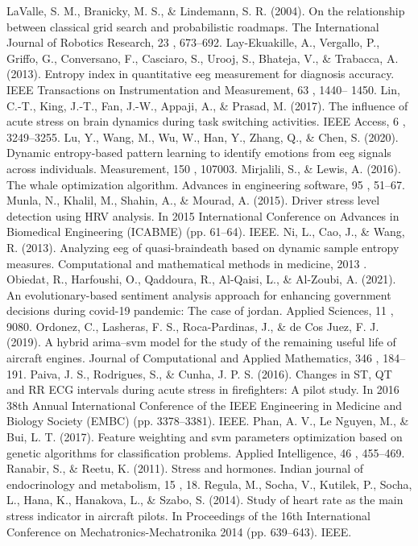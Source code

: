 LaValle, S. M., Branicky, M. S., \& Lindemann, S. R. (2004). On the relationship between classical grid search and probabilistic roadmaps. The International Journal of Robotics Research, 23 , 673–692.
Lay-Ekuakille, A., Vergallo, P., Griffo, G., Conversano, F., Casciaro, S., Urooj, S., Bhateja, V., \& Trabacca, A. (2013). Entropy index in quantitative eeg measurement for diagnosis accuracy. IEEE Transactions on Instrumentation and Measurement, 63 , 1440– 1450.
Lin, C.-T., King, J.-T., Fan, J.-W., Appaji, A., \& Prasad, M. (2017). The influence of acute stress on brain dynamics during task switching activities. IEEE Access, 6 , 3249–3255.
Lu, Y., Wang, M., Wu, W., Han, Y., Zhang, Q., \& Chen, S. (2020). Dynamic entropy-based pattern learning to identify emotions from eeg signals across individuals. Measurement, 150 , 107003.
Mirjalili, S., \& Lewis, A. (2016). The whale optimization algorithm. Advances in engineering software, 95 , 51–67.
Munla, N., Khalil, M., Shahin, A., \& Mourad, A. (2015). Driver stress level detection using HRV analysis. In 2015 International Conference on Advances in Biomedical Engineering (ICABME) (pp. 61–64). IEEE.
Ni, L., Cao, J., \& Wang, R. (2013). Analyzing eeg of quasi-braindeath based on dynamic sample entropy measures. Computational and mathematical methods in medicine, 2013 .
Obiedat, R., Harfoushi, O., Qaddoura, R., Al-Qaisi, L., \& Al-Zoubi, A. (2021). An evolutionary-based sentiment analysis approach for enhancing government decisions during covid-19 pandemic: The case of jordan. Applied Sciences, 11 , 9080.
Ordonez, C., Lasheras, F. S., Roca-Pardinas, J., \& de Cos Juez, F. J. (2019). A hybrid arima–svm model for the study of the remaining useful life of aircraft engines. Journal of Computational and Applied Mathematics, 346 , 184–191.
Paiva, J. S., Rodrigues, S., \& Cunha, J. P. S. (2016). Changes in ST, QT and RR ECG intervals during acute stress in firefighters: A pilot study. In 2016 38th Annual International Conference of the IEEE Engineering in Medicine and Biology Society (EMBC) (pp. 3378–3381). IEEE.
Phan, A. V., Le Nguyen, M., \& Bui, L. T. (2017). Feature weighting and svm parameters optimization based on genetic algorithms for classification problems. Applied Intelligence, 46 , 455–469.
Ranabir, S., \& Reetu, K. (2011). Stress and hormones. Indian journal of endocrinology and metabolism, 15 , 18.
Regula, M., Socha, V., Kutilek, P., Socha, L., Hana, K., Hanakova, L., \& Szabo, S. (2014). Study of heart rate as the main stress indicator in aircraft pilots. In Proceedings of the 16th International Conference on Mechatronics-Mechatronika 2014 (pp. 639–643). IEEE.

